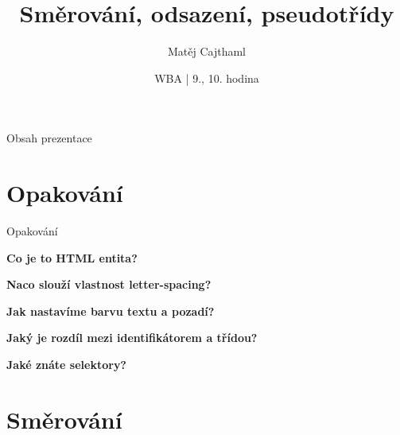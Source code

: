 \documentclass[aspectratio=1610]{beamer}
\title{Směrování, odsazení, pseudotřídy}
\date{WBA | 9., 10. hodina}
\author[Cajthaml]{Matěj Cajthaml}
\begin{document}
\begin{frame}
\titlepage
\end{frame}

\begin{frame}{Obsah prezentace}
    \begin{cardTiny}
        \begin{minipage}{\textwidth}
            \vspace{1ex}
            \tableofcontents
        \end{minipage}
    \end{cardTiny}
\end{frame}


\section{Opakování}

\begin{frame}{Opakování}
    \begin{cardTiny}
        \begin{center}
            \textbf{Co je to HTML entita?}
        \end{center}
    \end{cardTiny}
    \begin{cardTiny}
        \begin{center}
            \textbf{Naco slouží vlastnost letter-spacing?}
        \end{center}
    \end{cardTiny}
    \begin{cardTiny}
        \begin{center}
            \textbf{Jak nastavíme barvu textu a pozadí?}
        \end{center}
    \end{cardTiny}
    \begin{cardTiny}
        \begin{center}
            \textbf{Jaký je rozdíl mezi identifikátorem a třídou?}
        \end{center}
    \end{cardTiny}
    \begin{cardTiny}
        \begin{center}
            \textbf{Jaké znáte selektory?}
        \end{center}
    \end{cardTiny}
\end{frame}


\section{Směrování}
\end{document}
